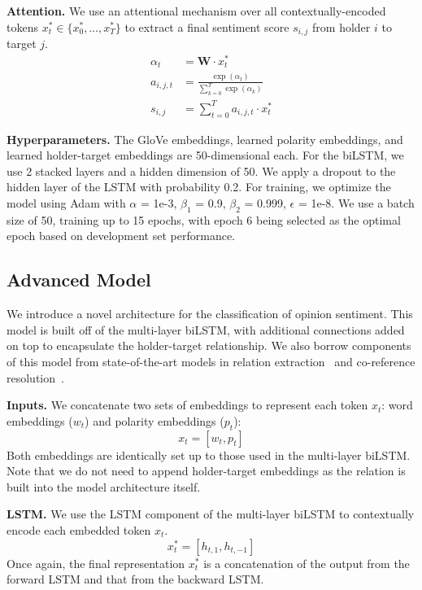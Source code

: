 \documentclass[11pt,a4paper]{article}
\begin{document}
\noindent\textbf{Attention.}
We use an attentional mechanism over all contextually-encoded tokens $x_t^*\in \{x_0^*, \dots, x_T^*\}$ to extract a final sentiment score $s_{i, j}$ from holder $i$ to target $j$.
\begin{align*}
\alpha_{t} & = \textbf{W} \cdot x^*_t \\
a_{i, j, t} & = \frac{\exp{(\alpha_t)}}{\sum^{T}_{k=0} \exp{(\alpha_k)}} \\
s_{i, j} & = \sum^{T}_{t = 0} a_{i, j, t}\cdot x_t^*
\end{align*}

\noindent\textbf{Hyperparameters.}
The GloVe embeddings, learned polarity embeddings, and learned holder-target embeddings are 50-dimensional each.
For the biLSTM, we use 2 stacked layers and a hidden dimension of 50. We apply a dropout to the hidden layer of the LSTM with probability 0.2.
For training, we optimize the model using Adam with $\alpha$ = 1e-3, $\beta_1$ = 0.9, $\beta_2$ = 0.999, $\epsilon$ = 1e-8. We use a batch size of 50, training up to 15 epochs, with epoch 6 being selected as the optimal epoch based on development set performance.

\subsection{Advanced Model} %
We introduce a novel architecture for the classification of opinion sentiment.
This model is built off of the multi-layer biLSTM, with additional connections added on top to encapsulate the holder-target relationship.
We also borrow components of this model from state-of-the-art models in relation extraction~\cite{Verga:18} and co-reference resolution~\cite{Lee:17}.

\noindent\textbf{Inputs.}
We concatenate two sets of embeddings to represent each token $x_t$: word embeddings ($w_t$) and polarity embeddings ($p_t$):
	$$x_t = [w_t, p_t]$$
Both embeddings are identically set up to those used in the multi-layer biLSTM.
Note that we do not need to append holder-target embeddings as the relation is built into the model architecture itself.

\noindent\textbf{LSTM.}
We use the LSTM component of the multi-layer biLSTM to contextually encode each embedded token $x_t$.
	$$x^*_t = [h_{t, 1}, h_{t, -1}]$$
Once again, the final representation $x^*_t$ is a concatenation of the output from the forward LSTM and that from the backward LSTM.
\end{document}
